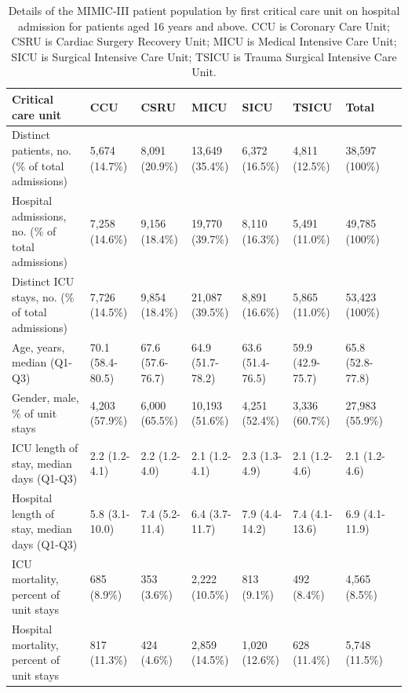\documentclass[english]{article}
\begin{document}
\begin{center}
\begin{table}
\begin{tabular}{|p{2.4cm}|p{1.2cm}|p{1.2cm}|p{1.2cm}|p{1.2cm}|p{1.2cm}|p{1.2cm}|p{1.2cm}|}
    \hline
    Critical care unit & CCU & CSRU & MICU & SICU & TSICU & Total \\
    \hline
    Distinct patients, no. (\% of total admissions) & 5,674 (14.7\%) & 8,091 (20.9\%) & 13,649 (35.4\%) & 6,372 (16.5\%) & 4,811 (12.5\%) & 38,597 (100\%) \\
    \hline
    Hospital admissions, no. (\% of total admissions) & 7,258 (14.6\%) & 9,156 (18.4\%) & 19,770 (39.7\%) & 8,110 (16.3\%) & 5,491 (11.0\%) & 49,785 (100\%) \\
    \hline
    Distinct ICU stays, no. (\% of total admissions) & 7,726 (14.5\%) & 9,854 (18.4\%) & 21,087 (39.5\%) & 8,891 (16.6\%) & 5,865 (11.0\%) & 53,423 (100\%) \\
    \hline
    Age, years, median (Q1-Q3) & 70.1 (58.4-80.5) & 67.6 (57.6-76.7) & 64.9 (51.7-78.2) & 63.6 (51.4-76.5) & 59.9 (42.9-75.7) & 65.8 (52.8-77.8) \\
    \hline
    Gender, male, \% of unit stays & 4,203 (57.9\%) & 6,000 (65.5\%) & 10,193 (51.6\%) & 4,251 (52.4\%) & 3,336 (60.7\%) & 27,983 (55.9\%) \\
    \hline
    ICU length of stay, median days (Q1-Q3) & 2.2 (1.2-4.1) & 2.2 (1.2-4.0) &  2.1 (1.2-4.1) & 2.3 (1.3-4.9) & 2.1 (1.2-4.6) & 2.1 (1.2-4.6) \\
    \hline
    Hospital length of stay, median days (Q1-Q3) & 5.8 (3.1-10.0) & 7.4 (5.2-11.4) & 6.4 (3.7-11.7) & 7.9 (4.4-14.2) & 7.4 (4.1-13.6) & 6.9 (4.1-11.9) \\
    \hline
    ICU mortality, percent of unit stays & 685 (8.9\%) & 353 (3.6\%) & 2,222 (10.5\%) & 813 (9.1\%) & 492 (8.4\%) & 4,565 (8.5\%) \\
    \hline
    Hospital mortality, percent of unit stays & 817 (11.3\%) & 424 (4.6\%) & 2,859 (14.5\%) &  1,020 (12.6\%) & 628 (11.4\%) & 5,748 (11.5\%) \\
    \hline
\end{tabular}
\caption{Details of the MIMIC-III patient population by first critical care unit on hospital admission for patients aged 16 years and above. CCU is Coronary Care Unit; CSRU is Cardiac Surgery Recovery Unit; MICU is Medical Intensive Care Unit; SICU is Surgical Intensive Care Unit; TSICU is Trauma Surgical Intensive Care Unit.}
\label{table:patientpopulation}
\end{table}
\end{center}
\end{document}
